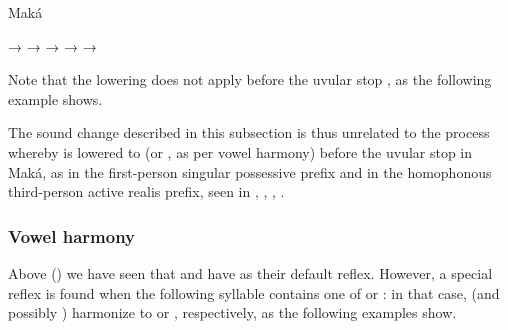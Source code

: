 \ea\label{mk-uvullow}
        Maká \citep[121, 130, 183, 361]{AG99}
    \begin{xlist}
        \ex {} → 
        \ex {} → 
        \ex {} → 
        \ex {} → 
        \ex {} → 
    \end{xlist}
\z
{}

Note that the lowering does not apply before the uvular stop , as the following example shows. 

\begin{exe}
    \ex \tsaqaq
\end{exe}

The sound change described in this subsection is thus unrelated to the process whereby  is lowered to  (or ,  as per vowel harmony) before the uvular stop  in Maká, as in the first-person singular possessive prefix  and in the homophonous third-person active realis prefix, seen in , , ,  \citep{AG94}.

\subsubsection{Vowel harmony}\label{mk-vh}

Above () we have seen that  and  have  as their default reflex. However, a special reflex is found when the following syllable contains one of  or : in that case,  (and possibly ) harmonize to  or , respectively, as the following examples show.

\begin{exe}
    \ex \armadillo
    \ex \alienable
    \ex \utensil
    \ex \wolf
    \ex \spring
    \ex \paralytic
    \ex \yawn
\end{exe}

